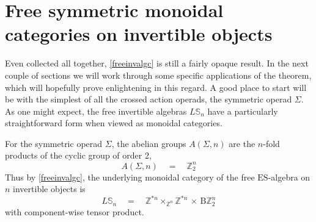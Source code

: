 \documentclass{amsbook} %
\numberwithin{section}{chapter}
\begin{document}
\section{Free symmetric monoidal categories on invertible objects}

Even collected all together, \cref{freeinvalgc} is still a fairly opaque result. In the next couple of sections we will work through some specific applications of the theorem, which will hopefully prove enlightening in this regard. A good place to start will be with the simplest of all the crossed action operads, the symmetric operad $\Sigma$. As one might expect, the free invertible algebras $L\mathbb{S}_n$ have a particularly straightforward form when viewed as monoidal categories.

\begin{prop} \label{invsymcat} For the symmetric operad $\Sigma$, the abelian groups $A(\Sigma,n)$ are the $n$-fold products of the cyclic group of order 2,
\[ A(\Sigma,n) \quad = \quad \mathbb{Z}_2^{n} \]
Thus by \cref{freeinvalgc}, the underlying monoidal category of the free $\mathrm{ES}$-algebra on $n$ invertible objects is
\[ L\mathbb{S}_n \quad = \quad \mathbb{Z}^{\ast n} \times_{\mathbb{Z}^n} \mathbb{Z}^{\ast n}  \, \times \, \mathrm{B}\mathbb{Z}_2^{n} \]
with component-wise tensor product.
\end{prop}
\end{document}
